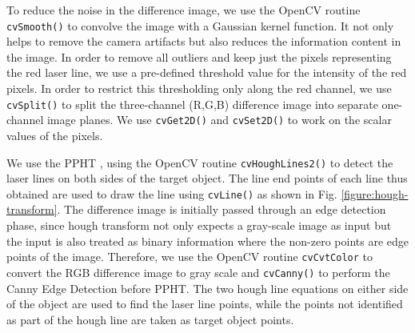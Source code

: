 To reduce the noise in the difference image, we use the OpenCV routine
\texttt{cvSmooth()} to convolve the image with a Gaussian kernel function. It
not only helps to remove the camera artifacts but also reduces the information
content in the image. In order to remove all outliers and keep just the pixels
representing the red laser line, we use a pre-defined threshold value for the
intensity of the red pixels. In order to restrict this thresholding only along
the red channel, we use \texttt{cvSplit()} to split the three-channel (R,G,B)
difference image into separate one-channel image planes. We use
\texttt{cvGet2D()} and \texttt{cvSet2D()} to work on the scalar values of the
pixels.



We use the \ac{PPHT} \cite{kiryati:1991}, \cite{matas:2000} using the OpenCV
routine \texttt{cvHoughLines2()} to detect the laser lines on both sides of
the target object. The line end points of each line thus obtained are used to
draw the line using \texttt{cvLine()} as shown in Fig.
\ref{figure:hough-transform}.  The difference image is initially passed
through an edge detection phase, since hough transform not only expects a
gray-scale image as input but the input is also treated as binary information
where the non-zero points are edge points of the image. Therefore, we use the
OpenCV routine \texttt{cvCvtColor} to convert the RGB difference image to gray
scale and \texttt{cvCanny()} to perform the Canny Edge Detection
\cite{canny:1986} before \ac{PPHT}. The two hough line equations on either
side of the object are used to find the laser line points, while the points
not identified as part of the hough line are taken as target object points.

